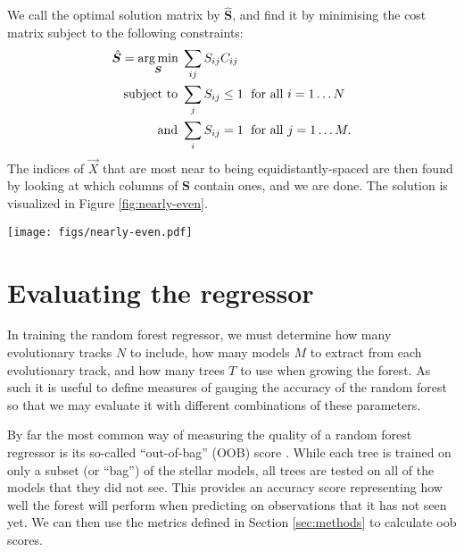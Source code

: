 \documentclass[manuscript]{aastex}
\begin{document}
We call the optimal solution matrix by $\hat{\boldsymbol{S}}$, and find it by minimising the cost matrix subject to the following constraints:
\begin{align}
  \hat{\boldsymbol{S}} = \underset{\boldsymbol S}{\arg\min} \; & \sum_{ij} S_{ij} C_{ij} \notag\\
  \text{subject to } & \sum_j S_{ij} \leq 1 \; \text{ for all } i=1\ldots N \notag\\
  \text{and } & \sum_i S_{ij} = 1 \; \text{ for all } j=1\ldots M.
  \label{eq:optimal-spacing}
\end{align}
The indices of $\vec X$ that are most near to being equidistantly-spaced are then found by looking at which columns of $\boldsymbol S$ contain ones, and we are done. The solution is visualized in Figure \ref{fig:nearly-even}.

\begin{figure*}
    \centering
    \texttt{[image: figs/nearly-even.pdf]}
    \caption{ A visaulization of the model selection process performed on each evolutionary track in order to obtain the same number of models from each track. The blue crosses show all of the models along the evolutionary track as they vary from ZAMS to TAMS in core-hydrogen abundance and the red crosses show the models selected from this track. The models were chosen via linear transport such that they satisfy Equation \ref{eq:optimal-spacing}. For reference, an equidistant spacing is shown with black points. }%
    \label{fig:nearly-even}
\end{figure*}


\section{Evaluating the regressor}
\label{sec:evaluation}
In training the random forest regressor, we must determine how many evolutionary tracks $N$ to include, how many models $M$ to extract from each evolutionary track, and how many trees $T$ to use when growing the forest. As such it is useful to define measures of gauging the accuracy of the random forest so that we may evaluate it with different combinations of these parameters. 

By far the most common way of measuring the quality of a random forest regressor is its so-called ``out-of-bag'' (OOB) score \citep[see section 3.1 of][]{breiman2001random}. While each tree is trained on only a subset (or ``bag'') of the stellar models, all trees are tested on all of the models that they did not see. This provides an accuracy score representing how well the forest will perform when predicting on observations that it has not seen yet. We can then use the metrics defined in Section \ref{sec:methods} to calculate oob scores. 
\end{document}
